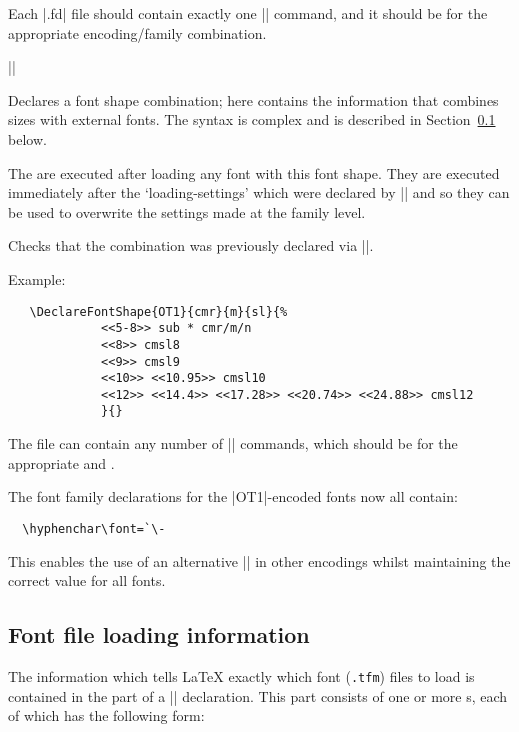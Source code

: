 \documentclass{ltxguide}[1995/11/28]
\begin{document}
Each |.fd| file should contain exactly one |\DeclareFontFamily|
command, and it should be for the appropriate encoding/family
combination.
 
\begin{decl}
|\DeclareFontShape|   
                    \\
        \null\hfill {} 
\end{decl}
 
Declares a font shape combination; here  contains the
information that combines sizes with external fonts. The syntax is
complex and is described in Section~\ref{sec:loadinfo} below.
 
The  are executed after loading any font with this
font shape.  They are executed immediately after the
`loading-settings' which were declared by |\DeclareFontFamily| and so
they can be used to overwrite the settings made at the family level.
 
Checks that the combination  was previously
declared via |\DeclareFontFamily|.
 
Example:
\begin{verbatim}
   \DeclareFontShape{OT1}{cmr}{m}{sl}{%
             <<5-8>> sub * cmr/m/n
             <<8>> cmsl8
             <<9>> cmsl9
             <<10>> <<10.95>> cmsl10
             <<12>> <<14.4>> <<17.28>> <<20.74>> <<24.88>> cmsl12
             }{}
\end{verbatim}
The file can contain any number of |\DeclareFontShape| commands,
which should be for the appropriate  and .
 
The font family declarations for the |OT1|-encoded fonts now all
contain:
\begin{verbatim}
  \hyphenchar\font=`\-
\end{verbatim}
This enables the use of an alternative |\hyphenchar| in other encodings
whilst maintaining the correct value for all fonts.

\subsection{Font file loading information}
\label{sec:loadinfo}
 
The information which tells \LaTeX{} exactly which font (\texttt{.tfm})
files to load is contained in the  part of a
|\DeclareFontShape| declaration. This part consists of one or more
s, each of which has the following form:
 
\end{document}
